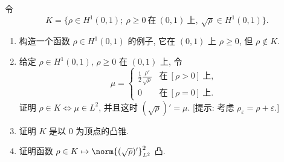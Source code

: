 \begin{exercise}
\label{exer:8.22}
令
\begin{equation*}
K=\{\rho\in H^1(0,1);\ \rho\ge0\ \text{在}\ (0,1)\ \text{上},\
\sqrt\rho\in H^1(0,1)\}.
\end{equation*}
\begin{enumerate}[label=\arabic*., leftmargin=2.2em, itemsep=0.3em]
	\item 构造一个函数 $\rho\in H^1(0,1)$ 的例子, 它在 $(0,1)$ 上
	      $\rho\ge0$, 但 $\rho\notin K$.
	\item 给定 $\rho\in H^1(0,1)$, $\rho\ge0$ 在 $(0,1)$ 上, 令
	      \begin{equation*}
	      \mu=
	      \begin{cases}
	      \frac12\frac{\rho'}{\sqrt\rho} & \text{在}\ [\rho>0]\ \text{上},\\
	      0 & \text{在}\ [\rho=0]\ \text{上}.
	      \end{cases}
	      \end{equation*}
	      证明 $\rho\in K\iff\mu\in L^2$, 并且这时 $(\sqrt\rho)'=\mu$.
	      [提示: 考虑 $\rho_\varepsilon=\rho+\varepsilon$.]
	\item 证明 $K$ 是以 $0$ 为顶点的凸锥.
	\item 证明函数 $\rho\in K\mapsto\norm{(\sqrt\rho)'}_{L^2}^2$ 凸.
\end{enumerate}
\end{exercise}

